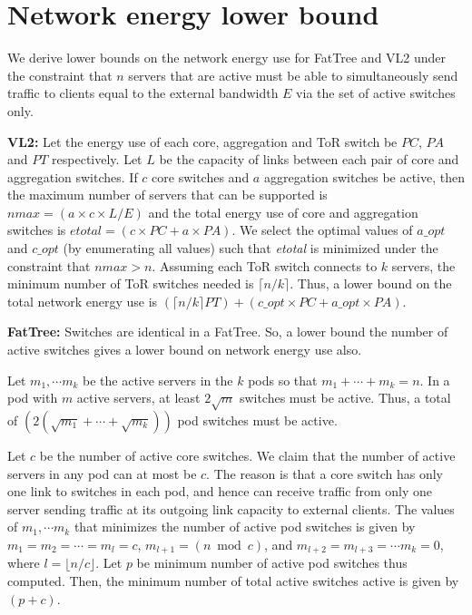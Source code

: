 


\chapter{Network energy lower bound}
\label{sec:netlb}
We derive lower bounds on the network energy use for FatTree \cite{fattree} and VL2 \cite{vl2} under the constraint that $n$  servers that are active must be able to simultaneously send traffic to clients equal to the external bandwidth $E$ via the set of active switches only.

\textbf{VL2:} Let the energy use of each core, aggregation and ToR switch be $PC$, $PA$ and $PT$ respectively.
Let $L$ be the capacity of links between each pair of core and aggregation switches. 
If  $c$ core switches and $a$ aggregation switches be active, then
the maximum number of servers that can be supported is $ \textit{nmax} = (a\times c\times L/E)$ and the total energy use of core and aggregation switches is $\textit{etotal} = (c \times PC + a \times PA)$. 
We select the optimal values of $\textit{a\_opt}$ and $\textit{c\_opt}$ (by enumerating all values) such that \textit{etotal} is minimized under the constraint that $\textit{nmax} > n$. 
Assuming each ToR switch connects to $k$ servers,  the minimum number of ToR switches needed is $\lceil n/k \rceil$. 
Thus, a lower bound on the total network energy use is $(\lceil n/k \rceil PT) + (\textit{c\_opt} \times PC + \textit{a\_opt} \times PA)$.


\textbf{FatTree:} Switches are identical in a FatTree. So, a lower bound the number of active switches gives a lower bound on network energy use also.




Let $m_1, \cdots m_k$ be the active servers in the $k$ pods so that $m_1 + \cdots + m_k = n$.  In a pod with $m$ active servers, at least $2 \sqrt{m}$ switches must be active. Thus, a total of $(2 (\sqrt{m_1} + \cdots + \sqrt{m_k} ))$ pod switches must be active. 

Let $c$ be the number of active core switches. We claim that the number of active servers in any pod can at most be $c$. The reason is that a core switch has only one link to switches in each pod, and hence can receive traffic from only one server sending traffic at its outgoing link capacity to external clients. The values of $m_1, \cdots m_k$ that minimizes the number of active pod switches is given by $m_1 = m_2 = \cdots = m_l = c$,  $m_{l+1} = (n \bmod c)$, and $m_{l+2} = m_{l+3} = \cdots  m_{k} = 0$, where $l = \lfloor n/c \rfloor$.  Let $p$ be minimum number of active pod switches thus computed. Then, the minimum number of total active switches active is given by $(p+c)$.



